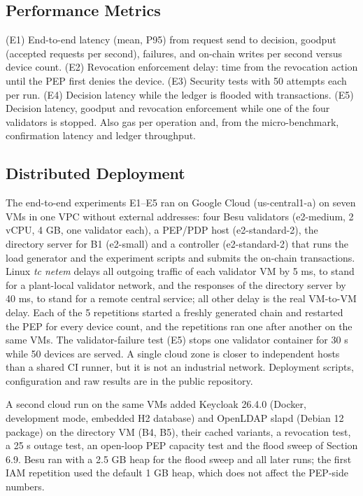 \documentclass[a4paper,5p,times,twocolumn,number,sort&compress]{elsarticle}
\begin{document}
\subsection{Performance Metrics}

(E1) End-to-end latency (mean, P95) from request send to decision, goodput (accepted requests per second), failures, and on-chain writes per second versus device count. (E2) Revocation enforcement delay: time from the revocation action until the PEP first denies the device. (E3) Security tests with 50 attempts each per run. (E4) Decision latency while the ledger is flooded with transactions. (E5) Decision latency, goodput and revocation enforcement while one of the four validators is stopped. Also gas per operation and, from the micro-benchmark, confirmation latency and ledger throughput.

\subsection{Distributed Deployment}

The end-to-end experiments E1--E5 ran on Google Cloud (us-central1-a) on seven VMs in one VPC without external addresses: four Besu validators (e2-medium, 2 vCPU, 4 GB, one validator each), a PEP/PDP host (e2-standard-2), the directory server for B1 (e2-small) and a controller (e2-standard-2) that runs the load generator and the experiment scripts and submits the on-chain transactions. Linux \emph{tc netem} delays all outgoing traffic of each validator VM by 5 ms, to stand for a plant-local validator network, and the responses of the directory server by 40 ms, to stand for a remote central service; all other delay is the real VM-to-VM delay. Each of the 5 repetitions started a freshly generated chain and restarted the PEP for every device count, and the repetitions ran one after another on the same VMs. The validator-failure test (E5) stops one validator container for 30 s while 50 devices are served. A single cloud zone is closer to independent hosts than a shared CI runner, but it is not an industrial network. Deployment scripts, configuration and raw results are in the public repository.

A second cloud run on the same VMs added Keycloak 26.4.0 (Docker, development mode, embedded H2 database) and OpenLDAP slapd (Debian 12 package) on the directory VM (B4, B5), their cached variants, a revocation test, a 25 s outage test, an open-loop PEP capacity test and the flood sweep of Section 6.9. Besu ran with a 2.5 GB heap for the flood sweep and all later runs; the first IAM repetition used the default 1 GB heap, which does not affect the PEP-side numbers.
\end{document}
